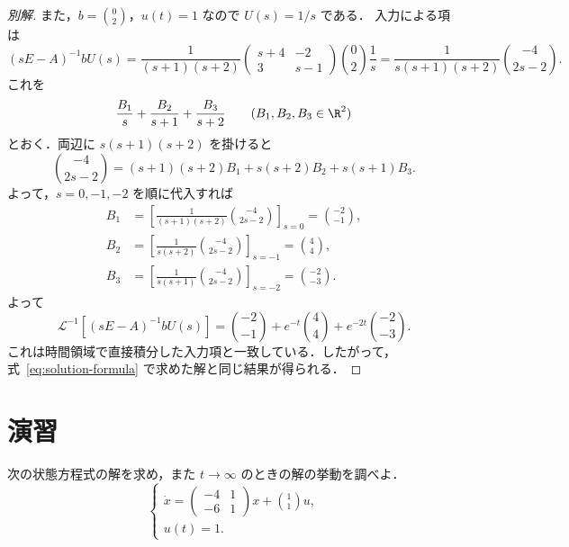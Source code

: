 \documentclass[article,paper=a4paper]{jlreq}
\begin{document}
\begin{proof}[別解]
また，$b=\binom{0}{2}$，$u(t)=1$ なので $U(s)=1/s$ である．
入力による項は
\[
  (sE-A)^{-1}bU(s)
    =
    \frac{1}{(s+1)(s+2)}
    \begin{pmatrix}
      s+4 & -2\\
      3 & s-1
    \end{pmatrix}
    \binom{0}{2}\frac{1}{s}
    =
    \frac{1}{s(s+1)(s+2)}
    \binom{-4}{2s-2}.
\]
これを
\[
  \frac{B_1}{s}+\frac{B_2}{s+1}+\frac{B_3}{s+2}
  \qquad (B_1,B_2,B_3\in\R^2)
\]
とおく．両辺に $s(s+1)(s+2)$ を掛けると
\[
  \binom{-4}{2s-2}
    =
    (s+1)(s+2)B_1
    +s(s+2)B_2
    +s(s+1)B_3.
\]
よって，$s=0,-1,-2$ を順に代入すれば
\begin{align*}
  B_1
    &=
    \left[
      \frac{1}{(s+1)(s+2)}
      \binom{-4}{2s-2}
    \right]_{s=0}
    =
    \binom{-2}{-1},\\
  B_2
    &=
    \left[
      \frac{1}{s(s+2)}
      \binom{-4}{2s-2}
    \right]_{s=-1}
    =
    \binom{4}{4},\\
  B_3
    &=
    \left[
      \frac{1}{s(s+1)}
      \binom{-4}{2s-2}
    \right]_{s=-2}
    =
    \binom{-2}{-3}.
\end{align*}
よって
\[
  \mathcal{L}^{-1}\!\left[(sE-A)^{-1}bU(s)\right]
    =
    \binom{-2}{-1}
    +
    e^{-t}\binom{4}{4}
    +
    e^{-2t}\binom{-2}{-3}.
\]
これは時間領域で直接積分した入力項と一致している．したがって，
式~\eqref{eq:solution-formula} で求めた解と同じ結果が得られる．
\end{proof}

\clearpage

\section{演習}

\begin{exe}
次の状態方程式の解を求め，また $t\to\infty$ のときの解の挙動を調べよ．
\[
  \begin{cases}
    \displaystyle
    \dot{x}
      =
      \begin{pmatrix}
        -4 & 1\\
        -6 & 1
      \end{pmatrix}x
      +
      \binom{1}{1}u,\\[3mm]
    u(t)=1.
  \end{cases}
\]
\end{exe}
\end{document}
